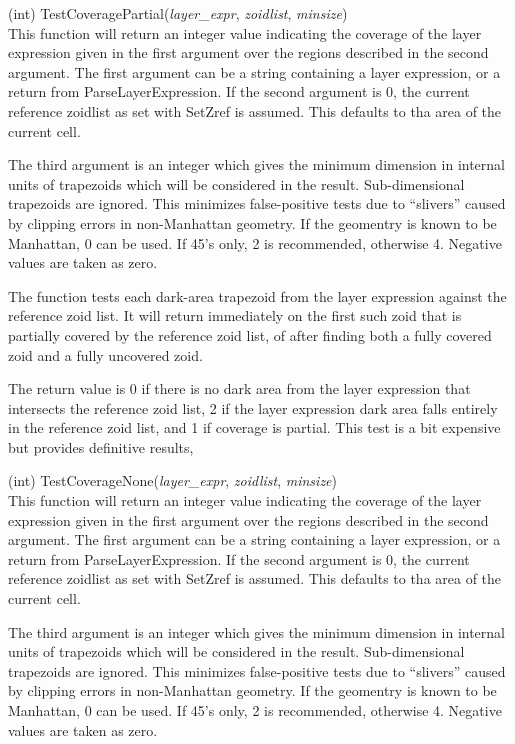 \begin{description}
\item{(int) \vt TestCoveragePartial({\it layer\_expr}, {\it zoidlist},
  {\it minsize\/})}\\
This function will return an integer value indicating the coverage of
the layer expression given in the first argument over the regions
described in the second argument.  The first argument can be a string
containing a layer expression, or a return from {\vt
ParseLayerExpression}.  If the second argument is 0, the current
reference zoidlist as set with {\vt SetZref} is assumed.  This
defaults to tha area of the current cell.

The third argument is an integer which gives the minimum dimension in
internal units of trapezoids which will be considered in the result. 
Sub-dimensional trapezoids are ignored.  This minimizes false-positive
tests due to ``slivers'' caused by clipping errors in non-Manhattan
geometry.  If the geomentry is known to be Manhattan, 0 can be used. 
If 45's only, 2 is recommended, otherwise 4.  Negative values are
taken as zero.

The function tests each dark-area trapezoid from the layer expression
against the reference zoid list.  It will return immediately on the
first such zoid that is partially covered by the reference zoid list,
of after finding both a fully covered zoid and a fully uncovered zoid.

The return value is 0 if there is no dark area from the layer
expression that intersects the reference zoid list, 2 if the layer
expression dark area falls entirely in the reference zoid list, and 1
if coverage is partial.  This test is a bit expensive but provides
definitive results,

\item{(int) \vt TestCoverageNone({\it layer\_expr}, {\it zoidlist},
  {\it minsize\/})}\\
This function will return an integer value indicating the coverage of
the layer expression given in the first argument over the regions
described in the second argument.  The first argument can be a string
containing a layer expression, or a return from {\vt
ParseLayerExpression}.  If the second argument is 0, the current
reference zoidlist as set with {\vt SetZref} is assumed.  This
defaults to tha area of the current cell.

The third argument is an integer which gives the minimum dimension in
internal units of trapezoids which will be considered in the result. 
Sub-dimensional trapezoids are ignored.  This minimizes false-positive
tests due to ``slivers'' caused by clipping errors in non-Manhattan
geometry.  If the geomentry is known to be Manhattan, 0 can be used. 
If 45's only, 2 is recommended, otherwise 4.  Negative values are
taken as zero.


\end{description}
